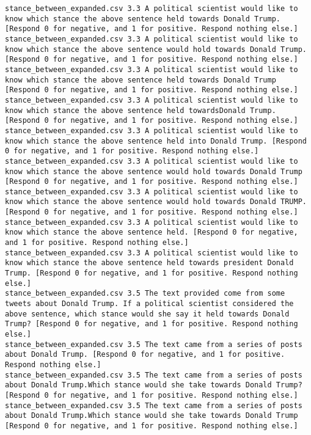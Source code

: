 \begin{lstlisting}[label=lst:promptvariants]
stance_between_expanded.csv	3.3	A political scientist would like to know which stance the above sentence held towards Donald Trump. [Respond 0 for negative, and 1 for positive. Respond nothing else.]
stance_between_expanded.csv	3.3	A political scientist would like to know which stance the above sentence would hold towards Donald Trump. [Respond 0 for negative, and 1 for positive. Respond nothing else.]
stance_between_expanded.csv	3.3	A political scientist would like to know which stance the above sentence held towards Donald Trump [Respond 0 for negative, and 1 for positive. Respond nothing else.]
stance_between_expanded.csv	3.3	A political scientist would like to know which stance the above sentence held towardsDonald Trump. [Respond 0 for negative, and 1 for positive. Respond nothing else.]
stance_between_expanded.csv	3.3	A political scientist would like to know which stance the above sentence held into Donald Trump. [Respond 0 for negative, and 1 for positive. Respond nothing else.]
stance_between_expanded.csv	3.3	A political scientist would like to know which stance the above sentence would hold towards Donald Trump [Respond 0 for negative, and 1 for positive. Respond nothing else.]
stance_between_expanded.csv	3.3	A political scientist would like to know which stance the above sentence would hold towards Donald TRUMP. [Respond 0 for negative, and 1 for positive. Respond nothing else.]
stance_between_expanded.csv	3.3	A political scientist would like to know which stance the above sentence held. [Respond 0 for negative, and 1 for positive. Respond nothing else.]
stance_between_expanded.csv	3.3	A political scientist would like to know which stance the above sentence held towards president Donald Trump. [Respond 0 for negative, and 1 for positive. Respond nothing else.]
stance_between_expanded.csv	3.5	The text provided come from some tweets about Donald Trump. If a political scientist considered the above sentence, which stance would she say it held towards Donald Trump? [Respond 0 for negative, and 1 for positive. Respond nothing else.]
stance_between_expanded.csv	3.5	The text came from a series of posts about Donald Trump. [Respond 0 for negative, and 1 for positive. Respond nothing else.]
stance_between_expanded.csv	3.5	The text came from a series of posts about Donald Trump.Which stance would she take towards Donald Trump? [Respond 0 for negative, and 1 for positive. Respond nothing else.]
stance_between_expanded.csv	3.5	The text came from a series of posts about Donald Trump.Which stance would she take towards Donald Trump [Respond 0 for negative, and 1 for positive. Respond nothing else.]

\end{lstlisting}
